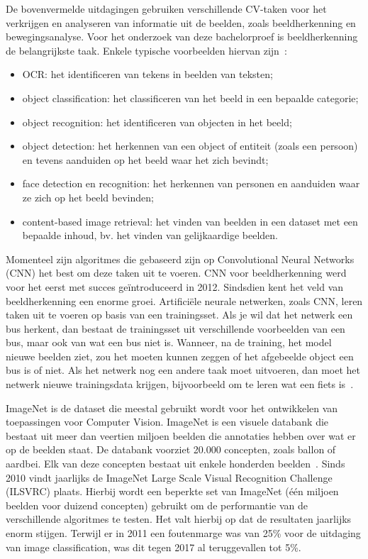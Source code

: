 De bovenvermelde uitdagingen gebruiken verschillende CV-taken voor het verkrijgen en analyseren van informatie uit de beelden, zoals beeldherkenning en bewegingsanalyse. Voor het onderzoek van deze bachelorproef is beeldherkenning de belangrijkste taak. Enkele typische voorbeelden hiervan zijn~\autocite{wikiCV}:
\begin{itemize}
	\item OCR: het identificeren van tekens in beelden van teksten;
	\item object classification: het classificeren van het beeld in een bepaalde categorie;
	\item object recognition: het identificeren van objecten in het beeld;
	\item object detection: het herkennen van een object of entiteit (zoals een persoon) en tevens aanduiden op het beeld waar het zich bevindt;
	\item face detection en recognition: het herkennen van personen en aanduiden waar ze zich op het beeld bevinden;
	\item content-based image retrieval: het vinden van beelden in een dataset met een bepaalde inhoud, bv. het vinden van gelijkaardige beelden.
\end{itemize}


Momenteel zijn algoritmes die gebaseerd zijn op Convolutional Neural Networks (CNN) het best om deze taken uit te voeren. CNN voor beeldherkenning werd voor het eerst met succes geïntroduceerd in 2012. Sindsdien kent het veld van beeldherkenning een enorme groei. Artifici\"{e}le neurale netwerken, zoals CNN, leren taken uit te voeren op basis van een trainingsset. Als je wil dat het netwerk een bus herkent, dan bestaat de trainingsset uit verschillende voorbeelden van een bus, maar ook van wat een bus niet is. Wanneer, na de training, het model nieuwe beelden ziet, zou het moeten kunnen zeggen of het afgebeelde object een bus is of niet. Als het netwerk nog een andere taak moet uitvoeren, dan moet het netwerk nieuwe trainingsdata krijgen, bijvoorbeeld om te leren wat een fiets is~\autocite{Pokharna2016}. 

ImageNet is de dataset die meestal gebruikt wordt voor het ontwikkelen van toepassingen voor Computer Vision. ImageNet is een visuele databank die bestaat uit meer dan veertien miljoen beelden die annotaties hebben over wat er op de beelden staat. De databank voorziet 20.000 concepten, zoals ballon of aardbei. Elk van deze concepten bestaat uit enkele honderden beelden~\autocites{WikiImageNet}{Brownlee2019a}. Sinds 2010 vindt jaarlijks de ImageNet Large Scale Visual Recognition Challenge (ILSVRC) plaats. Hierbij wordt een beperkte set van ImageNet (één miljoen beelden voor duizend concepten) gebruikt om de performantie van de verschillende algoritmes te testen. Het valt hierbij op dat de resultaten jaarlijks enorm stijgen. Terwijl er in 2011 een foutenmarge was van 25\% voor de uitdaging van image classification, was dit tegen 2017 al teruggevallen tot 5\%. 

